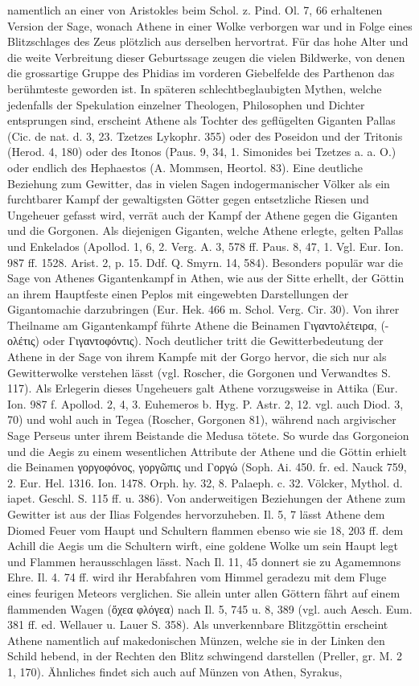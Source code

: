\documentclass[a4paper, 11pt, oneside]{article}
\begin{document}
namentlich an einer von Aristokles beim Schol. z. Pind. Ol. 7, 66 erhaltenen Version der Sage, wonach Athene in einer Wolke verborgen war und in Folge eines Blitzschlages des Zeus plötzlich aus derselben hervortrat. Für das hohe Alter und die weite Verbreitung dieser Geburtssage zeugen die vielen Bildwerke, von denen die grossartige Gruppe des Phidias im vorderen Giebelfelde des Parthenon das berühmteste geworden ist. In späteren schlechtbeglaubigten Mythen, welche jedenfalls der Spekulation einzelner Theologen, Philosophen und Dichter entsprungen sind, erscheint Athene als Tochter des geflügelten Giganten Pallas (Cic. de nat. d. 3, 23. Tzetzes Lykophr. 355) oder des Poseidon und der Tritonis (Herod. 4, 180) oder des Itonos (Paus. 9, 34, 1. Simonides bei Tzetzes a. a. O.) oder endlich des Hephaestos (A. Mommsen, Heortol. 83). Eine deutliche Beziehung zum Gewitter, das in vielen Sagen indogermanischer Völker als ein furchtbarer Kampf der gewaltigsten Götter gegen entsetzliche Riesen und Ungeheuer gefasst wird, verrät auch der Kampf der Athene gegen die Giganten und die Gorgonen. Als diejenigen Giganten, welche Athene erlegte, gelten Pallas und Enkelados (Apollod. 1, 6, 2. Verg. A. 3, 578 ff. Paus. 8, 47, 1. Vgl. Eur. Ion. 987 ff. 1528. Arist. 2, p. 15. Ddf. Q. Smyrn. 14, 584). Besonders populär war die Sage von Athenes Gigantenkampf in Athen, wie aus der Sitte erhellt, der Göttin an ihrem Hauptfeste einen Peplos mit eingewebten Darstellungen der Gigantomachie darzubringen (Eur. Hek. 466 m. Schol. Verg. Cir. 30). Von ihrer Theilname am Gigantenkampf führte Athene die Beinamen Γιγαντολέτειρα, (-ολέτις) oder Γιγαντοφόντις). Noch deutlicher tritt die Gewitterbedeutung der Athene in der Sage von ihrem Kampfe mit der Gorgo hervor, die sich nur als Gewitterwolke verstehen lässt (vgl. Roscher, die Gorgonen und Verwandtes S. 117). Als Erlegerin dieses Ungeheuers galt Athene vorzugsweise in Attika (Eur. Ion. 987 f. Apollod. 2, 4, 3. Euhemeros b. Hyg. P. Astr. 2, 12. vgl. auch Diod. 3, 70) und wohl auch in Tegea (Roscher, Gorgonen 81), während nach argivischer Sage Perseus unter ihrem Beistande die Medusa tötete. So wurde das Gorgoneion und die Aegis zu einem wesentlichen Attribute der Athene und die Göttin erhielt die Beinamen γοργοφόνος, γοργῶπις und Γοργώ (Soph. Ai. 450. fr. ed. Nauck 759, 2. Eur. Hel. 1316. Ion. 1478. Orph. hy. 32, 8. Palaeph. c. 32. Völcker, Mythol. d. iapet. Geschl. S. 115 ff. u. 386). Von anderweitigen Beziehungen der Athene zum Gewitter ist aus der Ilias Folgendes hervorzuheben. Il. 5, 7 lässt Athene dem Diomed Feuer vom Haupt und Schultern flammen ebenso wie sie 18, 203 ff. dem Achill die Aegis um die Schultern wirft, eine goldene Wolke um sein Haupt legt und Flammen herausschlagen lässt. Nach Il. 11, 45 donnert sie zu Agamemnons Ehre. Il. 4. 74 ff. wird ihr Herabfahren vom Himmel geradezu mit dem Fluge eines feurigen Meteors verglichen. Sie allein unter allen Göttern fährt auf einem flammenden Wagen (ὄχεα φλόγεα) nach Il. 5, 745 u. 8, 389 (vgl. auch Aesch. Eum. 381 ff. ed. Wellauer u. Lauer S. 358). Als unverkennbare Blitzgöttin erscheint Athene namentlich auf makedonischen Münzen, welche sie in der Linken den Schild hebend, in der Rechten den Blitz schwingend darstellen (Preller, gr. M. 2 1, 170). Ähnliches findet sich auch auf Münzen von Athen, Syrakus, 
\end{document}
